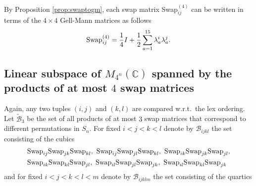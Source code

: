 \documentclass[12pt,dvipsnames,accepted=2016-08-18,a4paper,onecolumn]{quantumarticle}
\numberwithin{equation}{section}
\theoremstyle{definition}
\begin{document}
By Proposition \ref{prop:swaptogm}, each swap matrix Swap$^{(4)}_{ij}$ can be written in terms of the $4 \times 4$ Gell-Mann matrices as follows
\begin{align}\label{eq: sw-gm 4}
	\text{\textnormal{Swap}}^{(4)}_{ij}= \frac{1}{4} I + \frac{1}{2} \sum_{a=1}^{15} \lambda_a^i \lambda_a^j.
\end{align}
\subsection{Linear subspace of $M_{4^n}(\mathbb{C})$ spanned by the products of at most $4$ swap matrices}\label{a:d4l4}

Again, any two tuples $(i,j)$ and $(k,l)$ are compared w.r.t.~the lex ordering. Let $\tilde{\mathcal{B}}_3$ be the set of all products of at most $3$ swap matrices that correspond to different permutations in $S_n.$
For fixed $i<j<k<l$ denote by $\mathcal{B}_{ijkl}$ the set consisting of the cubics
\begin{equation}\label{eq: cubics}
	\begin{split}
&\textnormal{Swap}_{ij} \textnormal{Swap}_{jk} \textnormal{Swap}_{kl}, \ 
\textnormal{Swap}_{ij} \textnormal{Swap}_{jl} \textnormal{Swap}_{kl},\ 
\textnormal{Swap}_{ik} \textnormal{Swap}_{jk} \textnormal{Swap}_{jl},\\
&\textnormal{Swap}_{ik} \textnormal{Swap}_{kl} \textnormal{Swap}_{jl},\ 
\textnormal{Swap}_{il} \textnormal{Swap}_{jl} \textnormal{Swap}_{jk},\
\textnormal{Swap}_{il} \textnormal{Swap}_{kl} \textnormal{Swap}_{jk}
 \end{split}
\end{equation}
and for fixed $i<j<k<l<m$ denote by $\mathcal{B}_{ijklm}$ the set consisting of the quartics
\end{document}

